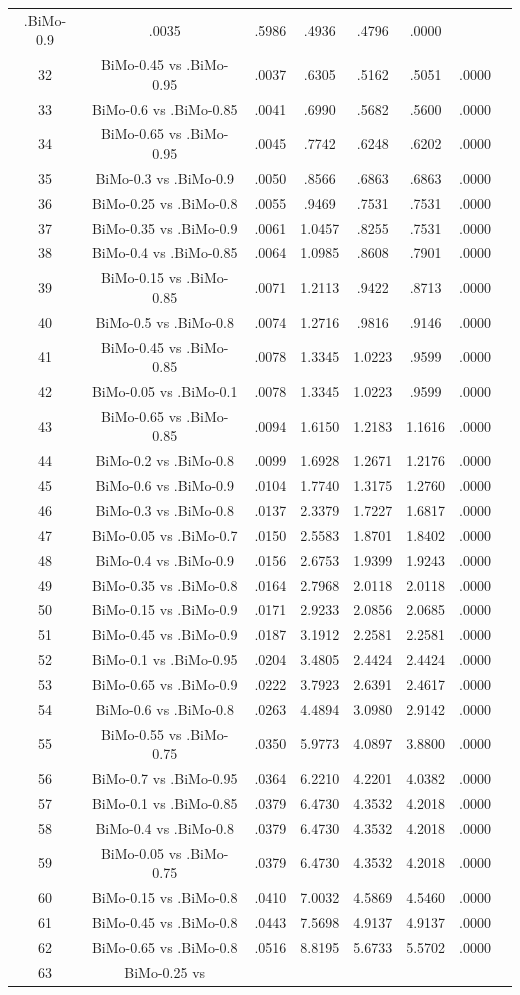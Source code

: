 \documentclass[a4paper,10pt]{article}
\begin{document}
\begin{landscape}
\begin{table}[!htp]
\begin{tabular}{cccccccc}
.BiMo-0.9&.0035&.5986&.4936&.4796&.0000\\32&BiMo-0.45 vs .BiMo-0.95&.0037&.6305&.5162&.5051&.0000\\33&BiMo-0.6 vs .BiMo-0.85&.0041&.6990&.5682&.5600&.0000\\34&BiMo-0.65 vs .BiMo-0.95&.0045&.7742&.6248&.6202&.0000\\35&BiMo-0.3 vs .BiMo-0.9&.0050&.8566&.6863&.6863&.0000\\36&BiMo-0.25 vs .BiMo-0.8&.0055&.9469&.7531&.7531&.0000\\37&BiMo-0.35 vs .BiMo-0.9&.0061&1.0457&.8255&.7531&.0000\\38&BiMo-0.4 vs .BiMo-0.85&.0064&1.0985&.8608&.7901&.0000\\39&BiMo-0.15 vs .BiMo-0.85&.0071&1.2113&.9422&.8713&.0000\\40&BiMo-0.5 vs .BiMo-0.8&.0074&1.2716&.9816&.9146&.0000\\41&BiMo-0.45 vs .BiMo-0.85&.0078&1.3345&1.0223&.9599&.0000\\42&BiMo-0.05 vs .BiMo-0.1&.0078&1.3345&1.0223&.9599&.0000\\43&BiMo-0.65 vs .BiMo-0.85&.0094&1.6150&1.2183&1.1616&.0000\\44&BiMo-0.2 vs .BiMo-0.8&.0099&1.6928&1.2671&1.2176&.0000\\45&BiMo-0.6 vs .BiMo-0.9&.0104&1.7740&1.3175&1.2760&.0000\\46&BiMo-0.3 vs .BiMo-0.8&.0137&2.3379&1.7227&1.6817&.0000\\47&BiMo-0.05 vs .BiMo-0.7&.0150&2.5583&1.8701&1.8402&.0000\\48&BiMo-0.4 vs .BiMo-0.9&.0156&2.6753&1.9399&1.9243&.0000\\49&BiMo-0.35 vs .BiMo-0.8&.0164&2.7968&2.0118&2.0118&.0000\\50&BiMo-0.15 vs .BiMo-0.9&.0171&2.9233&2.0856&2.0685&.0000\\51&BiMo-0.45 vs .BiMo-0.9&.0187&3.1912&2.2581&2.2581&.0000\\52&BiMo-0.1 vs .BiMo-0.95&.0204&3.4805&2.4424&2.4424&.0000\\53&BiMo-0.65 vs .BiMo-0.9&.0222&3.7923&2.6391&2.4617&.0000\\54&BiMo-0.6 vs .BiMo-0.8&.0263&4.4894&3.0980&2.9142&.0000\\55&BiMo-0.55 vs .BiMo-0.75&.0350&5.9773&4.0897&3.8800&.0000\\56&BiMo-0.7 vs .BiMo-0.95&.0364&6.2210&4.2201&4.0382&.0000\\57&BiMo-0.1 vs .BiMo-0.85&.0379&6.4730&4.3532&4.2018&.0000\\58&BiMo-0.4 vs .BiMo-0.8&.0379&6.4730&4.3532&4.2018&.0000\\59&BiMo-0.05 vs .BiMo-0.75&.0379&6.4730&4.3532&4.2018&.0000\\60&BiMo-0.15 vs .BiMo-0.8&.0410&7.0032&4.5869&4.5460&.0000\\61&BiMo-0.45 vs .BiMo-0.8&.0443&7.5698&4.9137&4.9137&.0000\\62&BiMo-0.65 vs .BiMo-0.8&.0516&8.8195&5.6733&5.5702&.0000\\63&BiMo-0.25 vs 
\end{tabular}
\end{table}
\end{landscape}
\end{document}
